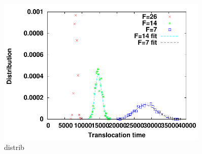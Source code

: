 \begin{figure}[H]
\begin{center}
\includegraphics[width=0.9\textwidth]{distriblargepore.pdf} 
\caption[Distribution des temps de translocation du polymère structuré avec un pore large]{distrib}
\label{holebiggerdistrib}
\end{center}
\end{figure}




